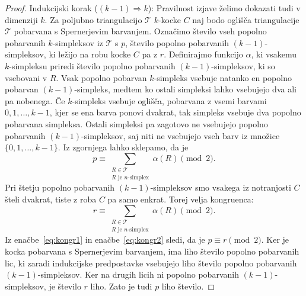 \documentclass[mat1]{fmfdelo}
\newcommand{\0}{0}
\newcommand{\pT}{\mathcal T}
\begin{document}
\begin{proof}
Indukcijski korak ($(k - 1) \Longrightarrow k$):
Pravilnost izjave želimo dokazati tudi v dimenziji $k$. Za poljubno triangulacijo $\pT$ $k$-kocke $C$ naj bodo oglišča triangulacije $\pT$ pobarvana s Spernerjevim barvanjem. Označimo število vseh popolno pobarvanih $k$-simpleksov iz $\pT$ s $p$, število popolno pobarvanih $(k-1)$-simpleksov, ki ležijo na robu kocke $C$ pa z $r$. Definirajmo funkcijo $\alpha$, ki vsakemu $k$-simpleksu priredi število popolno pobarvanih $(k-1)$-simpleksov, ki so vsebovani v $R$. Vsak popolno pobarvan $k$-simpleks vsebuje natanko en popolno pobarvan $(k-1)$-simpleks, medtem ko ostali simpleksi lahko vsebujejo dva ali pa nobenega. Če $k$-simpleks vsebuje oglišča, pobarvana z vsemi barvami $0, 1, \dots, k-1$, kjer se ena barva ponovi dvakrat, tak simpleks vsebuje dva popolno pobarvana simpleksa. Ostali simpleksi pa zagotovo ne vsebujejo popolno pobarvanih $(k - 1)$-simpleksov, saj niti ne vsebujejo vseh barv iz množice $\{0, 1, \dots, k-1 \}$. Iz zgornjega lahko sklepamo, da je
\begin{equation}\label{eq:kongr1}
p \equiv 
\sum\limits_{\substack{
R \in \pT
 \\ 
R\text{ je } n\text{-simplex}
 }}
  \alpha(R) \pmod 2.
\end{equation}
Pri štetju popolno pobarvanih $(k - 1)$-simpleksov smo vsakega iz notranjosti $C$ šteli dvakrat, tiste z roba $C$ pa samo enkrat. Torej velja kongruenca:
\begin{equation}\label{eq:kongr2}
r \equiv 
\sum\limits_{\substack{
R \in \pT
 \\ 
R\text{ je } n\text{-simplex}
 }}
  \alpha(R) \pmod 2.
\end{equation}
Iz enačbe~\eqref{eq:kongr1} in enačbe~\eqref{eq:kongr2} sledi, da je $p \equiv r \pmod 2$.
Ker je kocka pobarvana s Spernerjevim barvanjem, ima liho število popolno pobarvanih lic, ki zaradi indukcijske predpostavke vsebujejo liho število popolno pobarvanih $(k - 1)$-simpleksov. Ker na drugih licih ni popolno pobarvanih $(k - 1)$-simpleksov, je število $r$ liho. Zato je tudi $p$ liho število.
\end{proof}
\end{document}
